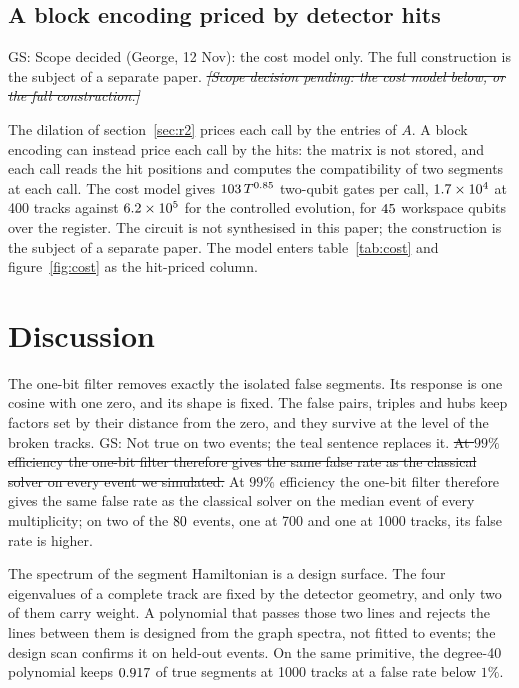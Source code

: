 \documentclass[11pt,a4paper]{article}
\newcommand{\gs}[1]{{\color{orange!85!black} GS: #1 }}
\newcommand{\gss}[1]{{\color{teal} #1}}
\newcommand{\gsx}[1]{{\color{gray}\sout{#1}}}
\begin{document}
\subsection{A block encoding priced by detector hits}\label{sec:r5}
\gs{Scope decided (George, 12 Nov): the cost model only. The full construction is the subject of a separate paper.} \gsx{\textit{[Scope decision pending: the cost model below, or the full construction.]}}

The dilation of section~\ref{sec:r2} prices each call by the entries of $A$. A block encoding can
instead price each call by the hits: the matrix is not stored, and each call reads the hit
positions and computes the compatibility of two segments at each call. The cost model gives
$103\,T^{0.85}$ two-qubit gates per call, $1.7\times10^{4}$ at 400 tracks
against $6.2\times10^{5}$ for the controlled evolution, for $45$ workspace qubits
over the register. The circuit is not synthesised in this paper; the construction is the subject of
a separate paper. The model enters table~\ref{tab:cost} and figure~\ref{fig:cost} as the hit-priced
column.

\section{Discussion}\label{sec:discussion}

The one-bit filter removes exactly the isolated false segments. Its response is one cosine with
one zero, and its shape is fixed. The false pairs, triples and hubs keep factors set by their
distance from the zero, and they survive at the level of the broken tracks. \gs{Not true on two events; the teal sentence replaces it.} \gsx{At $99\%$ efficiency the
one-bit filter therefore gives the same false rate as the classical solver on every event we
simulated.} \gss{At $99\%$ efficiency the one-bit filter therefore gives the same false rate as the classical solver on the median event of every multiplicity; on two of the $80$ events, one at 700 and one at 1000 tracks, its false rate is higher.}

The spectrum of the segment Hamiltonian is a design surface. The four eigenvalues of a complete
track are fixed by the detector geometry, and only two of them carry weight. A polynomial that
passes those two lines and rejects the lines between them is designed from the graph spectra, not
fitted to events; the design scan confirms it on held-out events. On the same primitive, the
degree-40 polynomial keeps $0.917$ of true segments at 1000 tracks at a false rate below
$1\%$.
\end{document}
